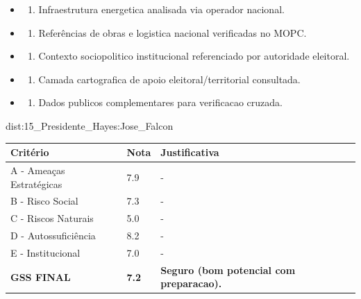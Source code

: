 {\begin{itemize}
\item
  \begin{enumerate}
  \def\labelenumi{\arabic{enumi})}
  \setcounter{enumi}{7}
  \tightlist
  \item
    Infraestrutura energetica analisada via operador nacional.
  \end{enumerate}
\item
  \begin{enumerate}
  \def\labelenumi{\arabic{enumi})}
  \setcounter{enumi}{8}
  \tightlist
  \item
    Referências de obras e logistica nacional verificadas no MOPC.
  \end{enumerate}
\item
  \begin{enumerate}
  \def\labelenumi{\arabic{enumi})}
  \setcounter{enumi}{9}
  \tightlist
  \item
    Contexto sociopolitico institucional referenciado por autoridade
    eleitoral.
  \end{enumerate}
\item
  \begin{enumerate}
  \def\labelenumi{\arabic{enumi})}
  \setcounter{enumi}{10}
  \tightlist
  \item
    Camada cartografica de apoio eleitoral/\allowbreak territorial consultada.
  \end{enumerate}
\item
  \begin{enumerate}
  \def\labelenumi{\arabic{enumi})}
  \setcounter{enumi}{11}
  \tightlist
  \item
    Dados publicos complementares para verificacao cruzada.
  \end{enumerate}
\end{itemize}}{dist:15_Presidente_Hayes:Jose_Falcon}
\begin{table}[ht!]
\small \begin{tabular}{p{3.0cm}p{0.8cm}p{6.0cm}} \toprule
\textbf{Critério} & \textbf{Nota} & \textbf{Justificativa} \\ \midrule
A - Ameaças Estratégicas & 7.9 & - \\
B - Risco Social & 7.3 & - \\
C - Riscos Naturais & 5.0 & - \\
D - Autossuficiência & 8.2 & - \\
E - Institucional & 7.0 & - \\
\midrule \textbf{GSS FINAL} & \textbf{7.2} & \textbf{Seguro (bom potencial com preparacao).} \\ \bottomrule \end{tabular}
\end{table}
